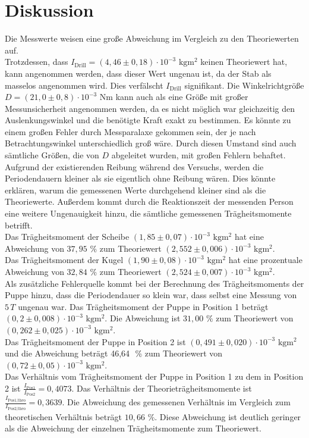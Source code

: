\section{Diskussion}
\label{sec:Diskussion}
Die Messwerte weisen eine große Abweichung im Vergleich zu den Theoriewerten auf.  \\
Trotzdessen, dass $I_{\text{Drill}} = (4,46 \pm 0,18) \cdot 10^{-3} \,\,\unit{\kilo\gram\meter\squared}$ keinen Theoriewert hat, kann angenommen werden, dass 
dieser Wert ungenau ist, da der Stab 
als masselos angenommen wird. Dies verfälscht $I_{\text{Drill}}$ signifikant. Die Winkelrichtgröße 
$D = (21,0 \pm 0,8) \cdot 10^{-3} \,\,\unit{\newton\meter}$ kann auch als eine Größe mit großer Messunsicherheit angenommen
werden, da es nicht möglich war gleichzeitig den Auslenkungswinkel und die benötigte Kraft exakt zu bestimmen. Es könnte zu einem großen 
Fehler durch Messparalaxe gekommen sein, der je nach Betrachtungswinkel unterschiedlich groß wäre. Durch diesen Umstand sind auch sämtliche 
Größen, die von $D$ abgeleitet wurden, mit großen Fehlern behaftet. \\
Aufgrund der existierenden Reibung während des Versuchs, werden die 
Periodendauern kleiner als sie eigentlich ohne Reibung wären. Dies könnte erklären, warum die gemessenen Werte durchgehend kleiner sind als die 
Theoriewerte. Außerdem kommt durch die Reaktionszeit der messenden Person eine weitere Ungenauigkeit hinzu, die sämtliche gemessenen 
Trägheitsmomente betrifft.\\
Das Trägheitsmoment der Scheibe $(1,85 \pm 0,07) \cdot 10^{-3} \,\,\unit{\kilo\gram\meter\squared}$ hat eine Abweichung von $37,95 \,\,\%$ 
zum Theoriewert $(2,552 \pm 0,006) \cdot 10^{-3} \,\,\unit{\kilo\gram\meter\squared}$.\\
Das Trägheitsmoment der Kugel $(1,90 \pm 0,08) \cdot 10^{-3} \,\,\unit{\kilo\gram\meter\squared}$ hat eine prozentuale 
Abweichung von $32,84 \,\,\%$ zum Theoriewert $(2,524 \pm 0,007) \cdot 10^{-3} \,\,\unit{\kilo\gram\meter\squared}$. \\
Als zusätzliche Fehlerquelle kommt bei der Berechnung des Trägheitsmoments der Puppe hinzu, dass die Periodendauer so klein war, dass selbst eine
Messung von $5\,T$ ungenau war. Das Trägheitsmoment der Puppe in Position 1 beträgt $(0,2 \pm 0,008) \cdot 10^{-3}\,\, \unit{\kilo\gram\meter\squared}$.
 Die Abweichung ist $31,00 \,\,\%$ zum Theoriewert von $(0,262 \pm 0,025) \cdot 10^{-3}\,\, \unit{\kilo\gram\meter\squared}$.\\
Das Trägheitsmoment der Puppe in Position 2 ist $ (0,491 \pm 0,020) \cdot 10^{-3}\,\, \unit{\kilo\gram\meter\squared}$ und die Abweichung beträgt 46,64 \,\,\% zum Theoriewert 
von $(0,72 \pm 0,05) \cdot 10^{-3}\,\, \unit{\kilo\gram\meter\squared}$.\\
Das Verhältnis vom Trägheitsmoment der Puppe in Position 1 zu dem in Position 2 ist $\frac{I_{\text{Pos1}}}{I_{\text{Pos2}}} = 0,4073$. Das
Verhältnis der Theorieträgheitsmomente ist $\frac{I_{\text{Pos1,theo}}}{I_{\text{Pos2,theo}}} = 0,3639$. Die Abweichung des gemessenen Verhältnis im
Vergleich zum theoretischen Verhältnis beträgt $10,66 \,\,\%$. Diese Abweichung ist deutlich geringer als die Abweichung der einzelnen Trägheitsmomente 
zum Theoriewert. 
%
